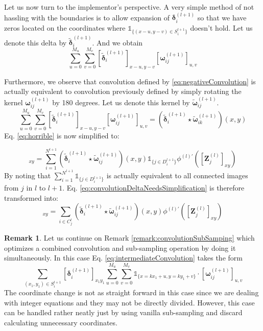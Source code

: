 \documentclass[a4paper,10pt]{article}
\theoremstyle{definition}
\newtheorem{remark}{Remark}
\begin{document}
Let us now turn to the implementor's perspective. A very simple method of not hassling with the boundaries is to allow expansion of $\pmb{\delta}^{(l+1)}_i$ so that we have zeros located on the coordinates where $\mathds{1}_{\{(x - u, y - v) \in S^{l+1}_i\}}$ doesn't hold. Let us denote this delta by $\tilde{\pmb{\delta}}^{(l+1)}_i$. And we obtain
\begin{equation}
\sum_{u = 0}^{M_u} \sum_{v = 0}^{M_v}  [\tilde{\pmb{\delta}}^{(l+1)}_i]_{x - u,y - v}  [\pmb{\omega}_{ij}^{(l+1)}]_{u,v}
\label{eq:negativeConvolution}
\end{equation}    

Furthermore, we observe that convolution defined by \ref{eq:negativeConvolution} is actually equivalent to convolution previously defined by simply rotating the kernel $\pmb{\omega}_{ij}^{(l+1)}$ by 180 degrees. Let us denote this kernel by $\tilde{\pmb{\omega}}_{ij}^{(l+1)}$.
\begin{equation}
\sum_{u = 0}^{M_u} \sum_{v = 0}^{M_v}  [\tilde{\pmb{\delta}}^{(l+1)}_i]_{x - u,y - v}  [\pmb{\omega}_{ij}^{(l+1)}]_{u,v} = (\tilde{\pmb{\delta}}^{(l+1)}_i \star \tilde{\pmb{\omega}}_{ik}^{(l + 1)})(x,y)
\end{equation}
Eq. \ref{eq:horrible} is now simplified to:

\begin{equation}
[\pmb{\delta}_j^{(l)}]_{xy} =\sum_{i = 1}^{N^{l+1}}(\tilde{\pmb{\delta}}^{(l+1)}_i \star \tilde{\pmb{\omega}}_{ij}^{(l + 1)})(x,y)\mathds{1}_{\{j \in D^{l+1}_i\}} \phi^{(l)'}([\pmb{Z}^{(l)}_{j}]_{xy})
\label{eq:convolutionDeltaNeedsSimplification}
\end{equation}
By noting that $\sum_{i = 1}^{N^{l+1}}\mathds{1}_{\{j \in D^{l+1}_i\}}$ is actually equivalent to all connected images from $j$ in $l$ to $l+1$. Eq. \ref{eq:convolutionDeltaNeedsSimplification} is therefore transformed into:
\begin{equation}
[\pmb{\delta}_j^{(l)}]_{xy} =\sum_{i \in C^l_j}(\tilde{\pmb{\delta}}^{(l+1)}_i \star \tilde{\pmb{\omega}}_{ij}^{(l + 1)})(x,y)\phi^{(l)'}([\pmb{Z}^{(l)}_{j}]_{xy})
\label{eq:convolutionDeltaSimplified}
\end{equation}

\begin{remark}
	Let us continue on Remark \ref{remark:convolutionSubSamping} which optimizes a combined convolution and sub-sampling operation by doing it simultaneously. In this case Eq. \ref{eq:intermediateConvolution} takes the form
	\begin{equation}
	\sum_{(x_1,y_1) \in S^{l+1}_i} [\pmb{\delta}^{(l+1)}_i]_{x_1y_1} \sum_{u = 0}^{M_u} \sum_{v = 0}^{M_v} \mathds{1}_{\{x = kx_1 + u, y = ky_1 + v\}} \cdot [\pmb{\omega}_{ij}^{(l+1)}]_{u,v}
	\label{eq:intermediateConvolutionSubSampling}
	\end{equation}
	The coordinate change is not as straight forward in this case since we are dealing with integer equations and they may not be directly divided. However, this case can be handled rather neatly just by using vanilla sub-sampling and discard calculating unnecessary coordinates.
	
\end{remark}
\end{document}
